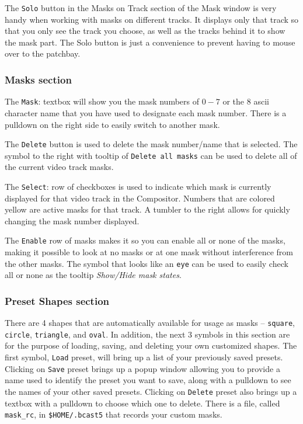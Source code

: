 The \texttt{Solo} button in the Masks on Track section of the Mask window is very handy when working with masks on different tracks.  It displays only that track so that you only see the track you choose, as well as the tracks behind it to show the mask part.  The Solo button is just a convenience to prevent having to mouse over to the patchbay.

\subsubsection*{Masks section}%
\label{ssub:masks_section}

The \texttt{Mask}: textbox will show you the mask numbers of $0-7$ or the 8 ascii character name that you have used to designate each mask number.  There is a pulldown on the right side to easily switch to another mask. 

The \texttt{Delete} button is used to delete the mask number/name that is selected. The symbol to the right with tooltip of \texttt{Delete all masks} can be used to delete all of the current video track masks.

The \texttt{Select}: row of checkboxes is used to indicate which mask is currently displayed for that video track in the Compositor.  Numbers that are colored yellow are active masks for that track.  A tumbler to the right allows for quickly changing the mask number displayed.

The \texttt{Enable} row of masks makes it so you can enable all or none of the masks, making it possible to look at no masks or at one mask without interference from the other masks. The symbol that looks like an \texttt{eye} can be used to easily check all or none as the tooltip \textit{Show/Hide mask states}.

\subsubsection*{Preset Shapes section}%
\label{ssub:preset_shape_section}

There are 4 shapes that are automatically available for usage as masks – \texttt{square}, \texttt{circle}, \texttt{triangle}, and \texttt{oval}.  In addition, the next 3 symbols in this section are for the purpose of loading, saving, and deleting your own customized shapes.  The first symbol, \texttt{Load} preset, will bring up a list of your previously saved presets.  Clicking on \texttt{Save} preset brings up a popup window allowing you to provide a name used to identify the preset you want to save, along with a pulldown to see the names of your other saved presets.   Clicking on \texttt{Delete} preset also brings up a textbox with a pulldown to choose which one to delete.  There is a file, called \texttt{mask\_rc}, in \texttt{\$HOME/.bcast5} that records your custom masks.  

